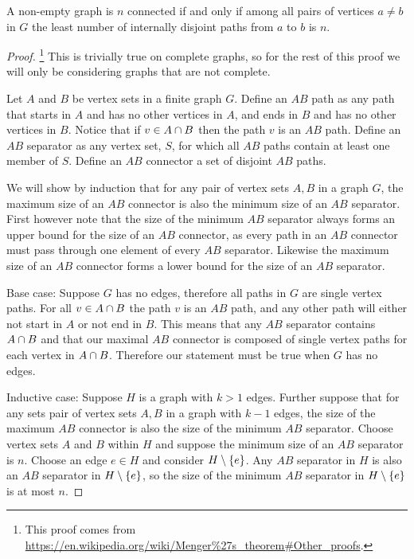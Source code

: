 \documentclass{article}
\begin{document}
\begin{theorem}\label{menger}
	A non-empty graph is $n$ connected if and only if among all pairs of vertices $a\not=b$ in $G$ the least number of internally disjoint paths from $a$ to $b$ is $n$.
\end{theorem}
\begin{proof}
	\footnote{This proof comes from \url{https://en.wikipedia.org/wiki/Menger\%27s_theorem\#Other_proofs}.}
	This is trivially true on complete graphs, so for the rest of this proof we will only be considering graphs that are not complete.
	
	Let $A$ and $B$ be vertex sets in a finite graph $G$. Define an $AB$ path as any path that starts in $A$ and has no other vertices in $A$, and ends in $B$ and has no other vertices in $B$. Notice that if $v\in A\cap B$ then the path $v$ is an $AB$ path. Define an $AB$ separator as any vertex set, $S$, for which all $AB$ paths contain at least one member of $S$. Define an $AB$ connector a set of disjoint $AB$ paths.
	
	We will show by induction that for any pair of vertex sets $A,B$ in a graph $G$, the maximum size of an $AB$ connector is also the minimum size of an $AB$ separator. First however note that the size of the minimum $AB$ separator always forms an upper bound for the size of an $AB$ connector, as every path in an $AB$ connector must pass through one element of every $AB$ separator. Likewise the maximum size of an $AB$ connector forms a lower bound for the size of an $AB$ separator. 
	
	Base case: Suppose $G$ has no edges, therefore all paths in $G$ are single vertex paths. For all $v \in A \cap B$ the path $v$ is an $AB$ path, and any other path will either not start in $A$ or not end in $B$. This means that any $AB$ separator contains $A\cap B$ and that our maximal $AB$ connector is composed of single vertex paths for each vertex in $A\cap B$. Therefore our statement must be true when $G$ has no edges.
	
	Inductive case: Suppose $H$ is a graph with $k>1$ edges. Further suppose that for any sets pair of vertex sets $A,B$ in a graph with $k-1$ edges, the size of the maximum $AB$ connector is also the size of the minimum $AB$ separator. Choose vertex sets $A$ and $B$ within $H$ and suppose the minimum size of an $AB$ separator is $n$. Choose an edge $e \in H$ and consider $H\setminus\left\{ {e} \right\}$. Any $AB$ separator in $H$ is also an $AB$ separator in $H\setminus\left\{ {e} \right\}$, so the size of the minimum $AB$ separator in $H\setminus\left\{ {e} \right\}$ is at most $n$.
	

\end{proof}
\end{document}
